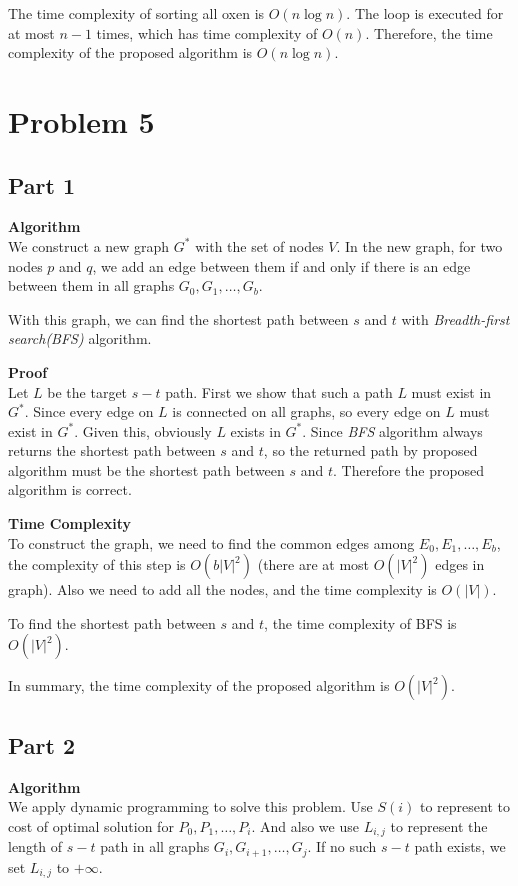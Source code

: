\documentclass{article}
\newcommand{\Complexity}{\vspace{0.3cm} \noindent\textbf{Time Complexity} \\}
\newcommand{\Proof}{\vspace{0.3cm} \noindent\textbf{Proof} \\}
\newcommand{\Algorithm}{\textbf{Algorithm} \\}
\begin{document}
The time complexity of sorting all oxen is $O(n\log n)$. The loop is executed for at most $n-1$
times, which has time complexity of $O(n)$. Therefore, the time complexity of the proposed algorithm
is $O(n\log n)$.

\section*{Problem 5}
\subsection*{Part 1}
\Algorithm
We construct a new graph $G^*$ with the set of nodes $V$. In the new graph, for two nodes $p$ and $q$,
we add an edge between them if and only if there is an edge between them in all graphs $G_0, G_1,
\dots, G_b$.

With this graph, we can find the shortest path between $s$ and $t$ with \textit{Breadth-first
search(BFS)} 
algorithm.

\Proof
Let $L$ be the target $s-t$ path. First we show that such a path $L$ must exist in $G^*$. Since
every edge on $L$ is connected on all graphs, so every edge on $L$ must exist in $G^*$. Given this,
obviously $L$ exists in $G^*$. Since \textit{BFS} algorithm always returns the shortest
path between $s$ and $t$, so the returned path by proposed algorithm must be the shortest path
between $s$ and $t$. Therefore the proposed algorithm is correct.

\Complexity
To construct the graph, we need to find the common edges among $E_0,E_1,\dots,E_b$, the complexity
of this step is $O(b|V|^2)$ (there are at most $O(|V|^2)$ edges in graph). 
Also we need to add all the nodes, and the time complexity  is $O(|V|)$.

To find the shortest path between $s$ and $t$, the time complexity of BFS is $O(|V|^2)$.

In summary, the time complexity of the proposed algorithm is $O(|V|^2)$.

\subsection*{Part 2}
\Algorithm
We apply dynamic programming to solve this problem. Use $S(i)$ to represent to cost of optimal solution
for $P_0, P_1, \dots, P_i$. And also we use $L_{i, j}$ to represent the length of $s-t$ path
in all graphs $G_i, G_{i+1}, \dots, G_j$. If no such $s-t$ path exists, we set $L_{i, j}$ to
$+\infty$.
\end{document}
